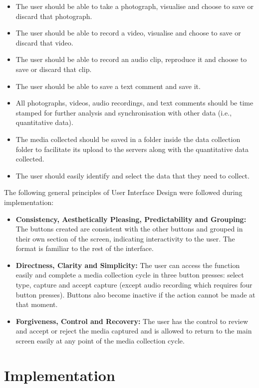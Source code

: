 \begin{itemize}
\item The user should be able to take a photograph, visualise and choose to save or discard that photograph.
\item The user should be able to record a video, visualise and choose to save or discard that video.
\item The user should be able to record an audio clip, reproduce it and choose to save or discard that clip.
\item The user should be able to save a text comment and save it.
\item All photographs, videos, audio recordings, and text comments should be time stamped for further analysis and synchronisation with other data (i.e., quantitative data).
\item The media collected should be saved in a folder inside the data collection folder to facilitate its upload to the servers along with the quantitative data collected.
\item The user should easily identify and select the data that they need to collect.

\end{itemize}

The following general principles of User Interface Design \cite{ui_design} were followed during implementation:

\begin{itemize}
    \item \textbf{Consistency, Aesthetically Pleasing, Predictability and Grouping:} The buttons created are consistent with the other buttons and grouped in their own section of the screen, indicating interactivity to the user. The format is familiar to the rest of the interface.
    \item \textbf{Directness, Clarity and Simplicity:} The user can access the function easily and complete a media collection cycle in three button presses: select type, capture and accept capture (except audio recording which requires four button presses). Buttons also become inactive if the action cannot be made at that moment.
    \item \textbf{Forgiveness, Control and Recovery:} The user has the control to review and accept or reject the media captured and is allowed to return to the main screen easily at any point of the media collection cycle.
\end{itemize}

\section{Implementation}

